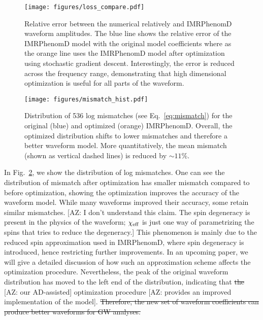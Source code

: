 \documentclass[twocolumn]{aastex631}
\newcommand{\AZ}[1]{{\color{Burnt}[AZ: #1]}}
\begin{document}
\begin{figure}[t]
	\begin{centering}
		\texttt{[image: figures/loss\_compare.pdf]}
		\caption{
			Relative error between the numerical relatively and IMRPhenomD waveform amplitudes. 
            The blue line shows the relative error of the IMRPhenomD model with the original model coefficients where as the orange line uses the IMRPhenomD model after optimization using stochastic gradient descent.
            Interestingly, the error is reduced across the frequency range, demonstrating that high dimensional optimization is useful for all parts of the waveform.
		}
		\label{fig:loss_compare}
	\end{centering}
\end{figure}

\begin{figure}[t]
	\begin{centering}
		\texttt{[image: figures/mismatch\_hist.pdf]}
		\caption{
			Distribution of 536 log mismatches (see Eq.~\ref{eq:mismatch}) for the original (blue) and optimized (orange) IMRPhenomD. 
            Overall, the optimized distribution shifts to lower mismatches and therefore a better waveform model. 
            More quantitatively, the mean mismatch (shown as vertical dashed lines) is reduced by $\sim11$\%.
		}
		\label{fig:mismatch_hist}
	\end{centering}
\end{figure}
 
In Fig.~\ref{fig:mismatch_hist}, we show the distribution of log mismatches.
One can see the distribution of mismatch after optimization has smaller mismatch compared to before optimization,
showing the optimization improves the accuracy of the waveform model.
While many waveforms improved their accuracy, some retain similar mismatches. 
\AZ{I don't understand this claim. The spin degeneracy is present in the physics of the waveform; $\chi_{\rm eff}$ is just one way of parametrizing the spins that tries to reduce the degeneracy.}
This phenomenon is mainly due to the reduced spin approximation used in IMRPhenomD, where spin degeneracy is introduced, hence restricting further improvements. 
In an upcoming paper, we will give a detailed discussion of how such an approximation scheme affects the optimization procedure. 
Nevertheless, the peak of the original waveform distribution has moved to the left end of the distribution, indicating that \sout{the} \AZ{our AD-assisted} optimization procedure \AZ{provides an improved implementation of the model}. 
\sout{Therefore, the new set of waveform coefficients can produce better waveforms for GW analyses. }
\end{document}

